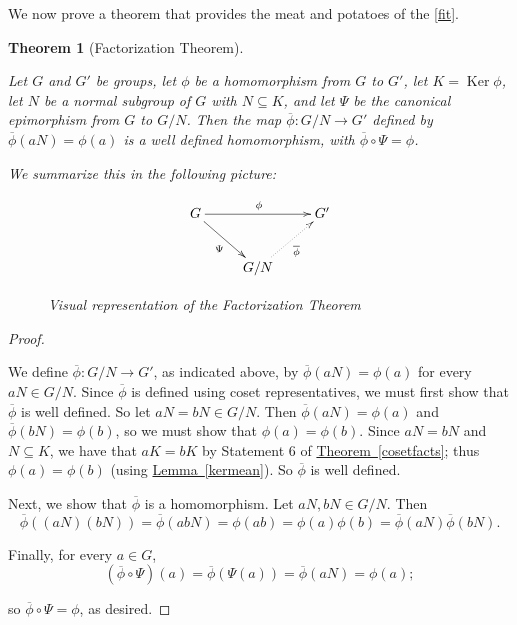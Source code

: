 \documentclass[10pt,]{book}
\theoremstyle{plain}
\newtheorem{theorem}{Theorem}[section]
\theoremstyle{definition}
\theoremstyle{definition}
\theoremstyle{definition}
\theoremstyle{definition}
\numberwithin{equation}{section}
\def\phibar{\overline{\phi}}
\DeclareMathOperator{\Ker}{Ker}
\begin{document}
    We now prove a theorem that
    provides the meat and potatoes of the \hyperref[fit]{\ref{fit}}.
\begin{theorem}[{Factorization Theorem}]\label{facthm}

         Let \(G\) and
        \(G'\) be groups, let \(\phi\) be a homomorphism from \(G\) to \(G'\),
        let \(K=\Ker \phi\), let \(N\) be a normal subgroup of \(G\) with
        \(N\subseteq K\), and let \(\Psi\) be the canonical epimorphism
        from \(G\) to \(G/N\). Then the map \(\phibar: G/N \to G'\) defined
        by \(\phibar(aN)=\phi(a)\) is a well defined homomorphism, with
        \(\phibar \circ \Psi=\phi\).

    We  summarize this in the following picture:
\leavevmode%
\begin{figure}
\centering
{
\[\xymatrix{G\ar[rr]^{\phi}\ar[dr]_{\Psi}&&G'\\&G/N\ar@{.>}[ur]_{\phibar}&}\]
}
\caption{Visual representation of the Factorization Theorem\label{figure-3}}
\end{figure}
\end{theorem}
\begin{proof}\hypertarget{proof-51}{}

      We define \(\phibar: G/N\to G'\), as indicated above, by
      \(\phibar(aN)=\phi(a)\) for every \(aN\in G/N\). Since \(\phibar\)
      is defined using coset representatives, we must first show that
      \(\phibar\) is well defined. So let \(aN=bN\in G/N\). Then
      \(\phibar(aN)=\phi(a)\) and \(\phibar(bN)=\phi(b)\), so we must
      show that \(\phi(a)=\phi(b)\). Since \(aN=bN\) and \(N\subseteq K\),
      we have that \(aK=bK\) by Statement 6 of \hyperref[cosetfacts]{Theorem~\ref{cosetfacts}}; thus \(\phi(a)=\phi(b)\) (using \hyperref[kermean]{Lemma~\ref{kermean}}). So \(\phibar\) is well defined.
\par

      Next, we show that \(\phibar\) is a homomorphism. Let \(aN,bN\in
      G/N\). Then
\begin{equation*}

        \phibar((aN)(bN))=\phibar(abN)=\phi(ab)=\phi(a)\phi(b)=\phibar(aN)\phibar(bN).
      
\end{equation*}

\par

      Finally, for every \(a\in G\),
\begin{equation*}

        (\phibar \circ
        \Psi)(a)=\phibar(\Psi(a))=\phibar(aN)=\phi(a);
      
\end{equation*}

      so \(\phibar \circ
      \Psi = \phi\), as desired.
\end{proof}
\par
\end{document}
